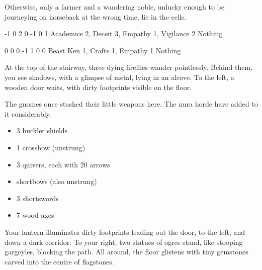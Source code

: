 \begin{multicols}{2}
Otherwise, only a farmer and a wandering noble, unlucky enough to be journeying on horseback at the wrong time, lie in the cells.

{-1}%
{0}%
{{2}%
{0}%
{-1}}%
{0}%
{1}%
{Academics 2, Deceit 3, Empathy 1, Vigilance 2}%
{Nothing}%
{}

{0}%
{0}%
{{0}%
{-1}%
{1}}%
{0}%
{0}%
{Beast Ken 1, Crafts 1, Empathy 1}%
{Nothing}%
{}


\begin{boxtext}

	At the top of the stairway, three dying fireflies wander pointlessly.
	Behind them, you see shadows, with a glimpse of metal, lying in an alcove.
	To the left, a wooden door waits, with dirty footprints visible on the floor.

\end{boxtext}

\begin{exampletext}

	The gnomes once stashed their little weapons here.
	The nura horde have added to it considerably.

\end{exampletext}

\begin{itemize}

	\item{3 buckler shields}
	\item{1 crossbow (unstrung)}
	\item{3 quivers, each with 20 arrows}
	\item{shortbows (also unstrung)}
	\item{3 shortswords}
	\item{7 wood axes}

\end{itemize}


\begin{boxtext}

	Your lantern illuminates dirty footprints leading out the door, to the left, and down a dark corridor.
	To your right, two statues of ogres stand, like stooping gargoyles, blocking the path.
	All around, the floor glistens with tiny gemstones carved into the centre of flagstones.


\end{boxtext}
\end{multicols}
